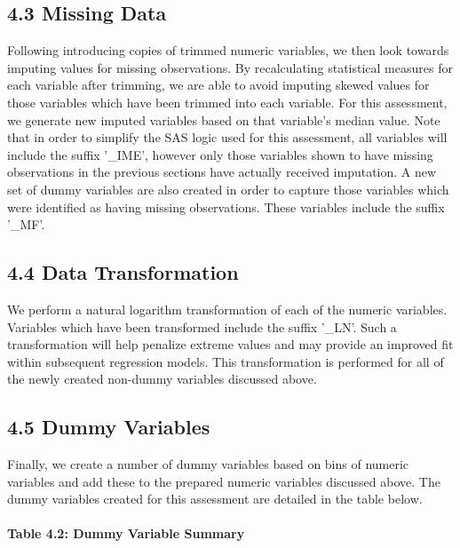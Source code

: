 \documentclass[]{article}
\let\oldparagraph\paragraph
\renewcommand{\paragraph}[1]{\oldparagraph{#1}\mbox{}}
\begin{document}
\subsection{4.3 Missing Data}\label{missing-data}

Following introducing copies of trimmed numeric variables, we then look
towards imputing values for missing observations. By recalculating
statistical measures for each variable after trimming, we are able to
avoid imputing skewed values for those variables which have been trimmed
into each variable. For this assessment, we generate new imputed
variables based on that variable's median value. Note that in order to
simplify the SAS logic used for this assessment, all variables will
include the suffix '\_IME', however only those variables shown to have
missing observations in the previous sections have actually received
imputation. A new set of dummy variables are also created in order to
capture those variables which were identified as having missing
observations. These variables include the suffix '\_MF'.

\subsection{4.4 Data Transformation}\label{data-transformation}

We perform a natural logarithm transformation of each of the numeric
variables. Variables which have been transformed include the suffix
'\_LN'. Such a transformation will help penalize extreme values and may
provide an improved fit within subsequent regression models. This
transformation is performed for all of the newly created non-dummy
variables discussed above.

\subsection{4.5 Dummy Variables}\label{dummy-variables}

Finally, we create a number of dummy variables based on bins of numeric
variables and add these to the prepared numeric variables discussed
above. The dummy variables created for this assessment are detailed in
the table below.

\newpage

\paragraph{Table 4.2: Dummy Variable
Summary}\label{table-4.2-dummy-variable-summary}
\end{document}
